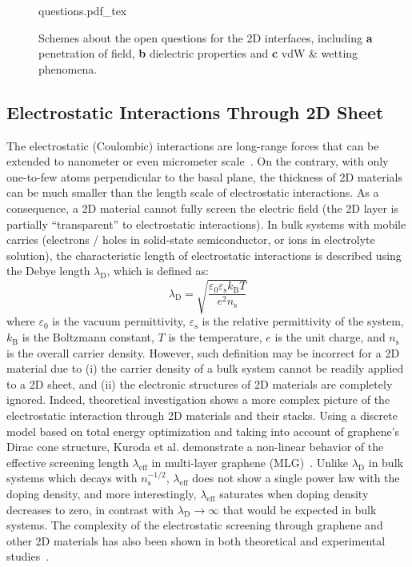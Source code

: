 \begin{figure}[h]
  \centering
  {questions.pdf_tex}
  \caption{\label{fig:intro-questions}%
    Schemes about the open questions for the 2D interfaces, including
    \textbf{a} penetration of field, \textbf{b} dielectric properties
    and \textbf{c} vdW \& wetting phenomena. }
\end{figure}


\subsection{Electrostatic Interactions Through 2D Sheet}
\label{sec:electr-inter-thro}

The electrostatic (Coulombic) interactions are long-range forces that
can be extended to nano\-meter or even micro\-meter scale~\autocite{Lacava_2016-electrodyn}.
%
On the contrary, with only one-to-few atoms perpendicular to the basal
plane, the thickness of 2D materials can be much smaller than the
length scale of electrostatic interactions.
%
As a consequence, a 2D material cannot fully screen the electric field
(\ie the 2D layer is partially ``transparent'' to electrostatic
interactions).
%
In bulk systems with mobile carries (electrons / holes in solid-state
semiconductor, or ions in electrolyte solution), the characteristic
length of electrostatic interactions is described using the Debye
length $\lambda_{\mathrm{D}}$, which is defined as:
\begin{equation}
  \label{eq:intro-debye}
  \lambda_{\mathrm{D}} = {\displaystyle \sqrt{
      \frac{\varepsilon_{0} \varepsilon_{\mathrm{s}} k_{\mathrm{B}} T}
      {e^{2} n_{\mathrm{s}}}
    }}
\end{equation}
where $\varepsilon_{0}$ is the vacuum permittivity,
$\varepsilon_{\mathrm{s}}$ is the relative permittivity of the system,
$k_{\mathrm{B}}$ is the Boltzmann constant, $T$ is the temperature,
$e$ is the unit charge, and $n_{\mathrm{s}}$ is the overall carrier
density.
%
However, such definition may be incorrect for a 2D material due to
(i) the carrier density of a bulk system cannot be readily applied to
a 2D sheet, and (ii) the electronic structures of 2D materials are
completely ignored.
%
Indeed, theoretical investigation shows a more complex picture of the
electrostatic interaction through 2D materials and their stacks.
%
Using a discrete model based on total energy optimization and taking
into account of graphene's Dirac cone structure, Kuroda et
al. demonstrate a non-linear behavior of the effective screening
length $\lambda_{\mathrm{eff}}$ in multi-layer graphene
(MLG)~\autocite{Kuroda_2011_PRL_ML,Kuroda_2011_ML_gr,Rokni_2017_charge_ML_Gr}.
%
Unlike $\lambda_{\mathrm{D}}$ in bulk systems which decays with
$n_{\mathrm{s}}^{-1/2}$, $\lambda_{\mathrm{eff}}$ does not show a
single power law with the doping density, and more interestingly,
$\lambda_{\mathrm{eff}}$ saturates when doping density decreases to
zero, in contrast with $\lambda_{\mathrm{D}} \to \infty$ that would be
expected in bulk systems.
%
The complexity of the electrostatic screening through graphene and
other 2D materials has also been shown in both theoretical and
experimental
studies~\autocite{Datta_2009_ML_Screening,Uesugi_2013_EDL_ML,Goto_2013_ML_Gr,Liluhua_2014_hbn}.
%

